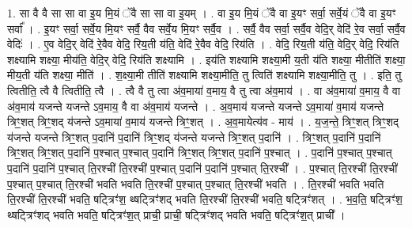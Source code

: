 \documentclass[17pt]{extarticle}
\begin{document}
1. सा वै वै सा सा वा इ॒य मि॒यं ॅवै सा सा वा इ॒यम् । . वा इ॒य मि॒यं ॅवै वा इ॒यꣳ सर्वा॒ सर्वे॒यं ॅवै वा इ॒यꣳ सर्वा᳚ । . इ॒यꣳ सर्वा॒ सर्वे॒य मि॒यꣳ सर्वै॒ वैव सर्वे॒य मि॒यꣳ सर्वै॒व । . सर्वै॒ वैव सर्वा॒ सर्वै॒व वेदि॒र् वेदि॑ रे॒व सर्वा॒ सर्वै॒व वेदिः॑ । . ए॒व वेदि॒र् वेदि॑ रे॒वैव वेदि॒ रिय॒ती य॑ति॒ वेदि॑ रे॒वैव वेदि॒ रिय॑ति । . वेदि॒ रिय॒ती य॑ति॒ वेदि॒र् वेदि॒ रिय॑ति शक्ष्यामि शक्ष्या॒ मीय॑ति॒ वेदि॒र् वेदि॒ रिय॑ति शक्ष्यामि । . इय॑ति शक्ष्यामि शक्ष्या॒मी य॒ती य॑ति शक्ष्या॒ मीतीति॑ शक्ष्या॒ मीय॒ती य॑ति शक्ष्या॒ मीति॑ । . श॒क्ष्या॒मी तीति॑ शक्ष्यामि शक्ष्या॒मीति॒ तु त्विति॑ शक्ष्यामि शक्ष्या॒मीति॒ तु । . इति॒ तु त्वितीति॒ त्वै वै त्वितीति॒ त्वै । . त्वै वै तु त्वा अ॑व॒माया॑ व॒माय॒ वै तु त्वा अ॑व॒माय॑ । . वा अ॑व॒माया॑ व॒माय॒ वै वा अ॑व॒माय॑ यजन्ते यजन्ते ऽव॒माय॒ वै वा अ॑व॒माय॑ यजन्ते । . अ॒व॒माय॑ यजन्ते यजन्ते ऽव॒माया॑ व॒माय॑ यजन्ते त्रिꣳ॒॒शत् त्रिꣳ॒॒शद् य॑जन्ते ऽव॒माया॑ व॒माय॑ यजन्ते त्रिꣳ॒॒शत् । . अ॒व॒मायेत्य॑व - माय॑ । . य॒ज॒न्ते॒ त्रिꣳ॒॒शत् त्रिꣳ॒॒शद् य॑जन्ते यजन्ते त्रिꣳ॒॒शत् प॒दानि॑ प॒दानि॑ त्रिꣳ॒॒शद् य॑जन्ते यजन्ते त्रिꣳ॒॒शत् प॒दानि॑ । . त्रिꣳ॒॒शत् प॒दानि॑ प॒दानि॑ त्रिꣳ॒॒शत् त्रिꣳ॒॒शत् प॒दानि॑ प॒श्चात् प॒श्चात् प॒दानि॑ त्रिꣳ॒॒शत् त्रिꣳ॒॒शत् प॒दानि॑ प॒श्चात् । . प॒दानि॑ प॒श्चात् प॒श्चात् प॒दानि॑ प॒दानि॑ प॒श्चात् ति॒रश्ची॑ ति॒रश्ची॑ प॒श्चात् प॒दानि॑ प॒दानि॑ प॒श्चात् ति॒रश्ची᳚ । . प॒श्चात् ति॒रश्ची॑ ति॒रश्ची॑ प॒श्चात् प॒श्चात् ति॒रश्ची॑ भवति भवति ति॒रश्ची॑ प॒श्चात् प॒श्चात् ति॒रश्ची॑ भवति । . ति॒रश्ची॑ भवति भवति ति॒रश्ची॑ ति॒रश्ची॑ भवति॒ षट्त्रिꣳ॑श॒ थ्षट्त्रिꣳ॑शद् भवति ति॒रश्ची॑ ति॒रश्ची॑ भवति॒ षट्त्रिꣳ॑शत् । . भ॒व॒ति॒ षट्त्रिꣳ॑श॒ थ्षट्त्रिꣳ॑शद् भवति भवति॒ षट्त्रिꣳ॑श॒त् प्राची॒ प्राची॒ षट्त्रिꣳ॑शद् भवति भवति॒ षट्त्रिꣳ॑श॒त् प्राची᳚ । \newline
\end{document}
